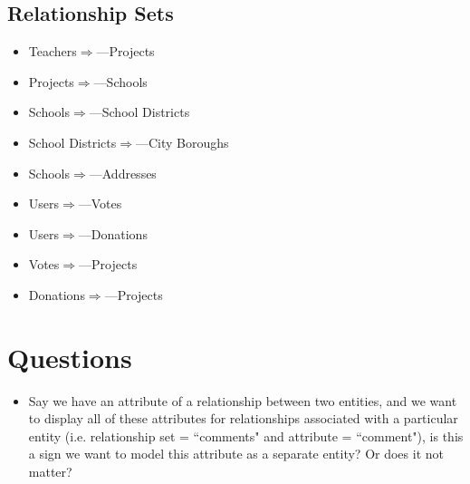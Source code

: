\documentclass{article}
\begin{document}
\subsection{Relationship Sets} %
\label{sub:relationship_sets}
\begin{multicols}{2}
\begin{itemize}
  \item Teachers$\Rightarrow$---Projects
  \item Projects$\Rightarrow$---Schools
  \item Schools$\Rightarrow$---School Districts
  \item School Districts$\Rightarrow$---City Boroughs
  \item Schools$\Rightarrow$---Addresses
  \item Users$\Rightarrow$---Votes
  \item Users$\Rightarrow$---Donations
  \item Votes$\Rightarrow$---Projects
  \item Donations$\Rightarrow$---Projects
    
  
\end{itemize}
\end{multicols}



\section{Questions} %
\label{sec:questions}

\begin{itemize}

  \item Say we have an attribute of a relationship between two entities, and we want to
  display all of these attributes for relationships associated with a particular entity
  (i.e. relationship set = ``comments" and attribute = ``comment"), is this a sign we
  want to model this attribute as a separate entity? Or does it not matter?
  
   \end{itemize}

\end{document}
